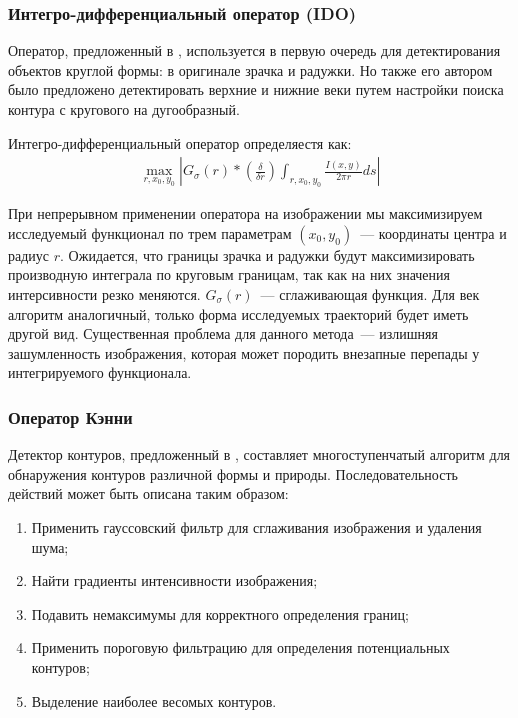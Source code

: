 \documentclass[12pt]{article} %
\begin{document}
\subsubsection{Интегро-дифференциальный оператор (IDO)}

Оператор, предложенный в \cite{Daugman2, Daugman4, Daugman, Daugman3}, используется в первую очередь для детектирования объектов круглой формы: в оригинале зрачка и радужки. Но также его автором было предложено детектировать верхние и нижние веки путем настройки поиска контура с кругового на дугообразный.

Интегро-дифференциальный оператор определяестя как:
\begin{gather}\label{norm}
	\max_{r, x_0, y_0}{\left| G_\sigma(r)*\left(\frac{\delta}{\delta r}\right)\int_{r, x_0, y_0}{\frac{I(x,y)}{2\pi r}ds}\right|}
\end{gather}

При непрерывном применении оператора на изображении мы максимизируем исследуемый функционал по трем параметрам $(x_0, y_0)$~--- координаты центра и радиус $r$. Ожидается, что границы зрачка и радужки будут максимизировать производную интеграла по круговым границам, так как на них значения интерсивности резко меняются. $G_\sigma(r)$~--- сглаживающая функция. Для век алгоритм аналогичный, только форма исследуемых траекторий будет иметь другой вид. Существенная проблема для данного метода~--- излишняя зашумленность изображения, которая может породить внезапные перепады у интегрируемого функционала.


\subsubsection{Оператор Кэнни}

Детектор контуров, предложенный в \cite{Canny}, составляет многоступенчатый алгоритм для обнаружения контуров различной формы и природы. Последовательность действий может быть описана таким образом:

\begin{enumerate}
	\item Применить гауссовский фильтр для сглаживания изображения и удаления шума;
	\item Найти градиенты интенсивности изображения;
	\item Подавить немаксимумы для корректного определения границ;
	\item Применить пороговую фильтрацию для определения потенциальных контуров;
	\item Выделение наиболее весомых контуров.
\end{enumerate}
\end{document}
